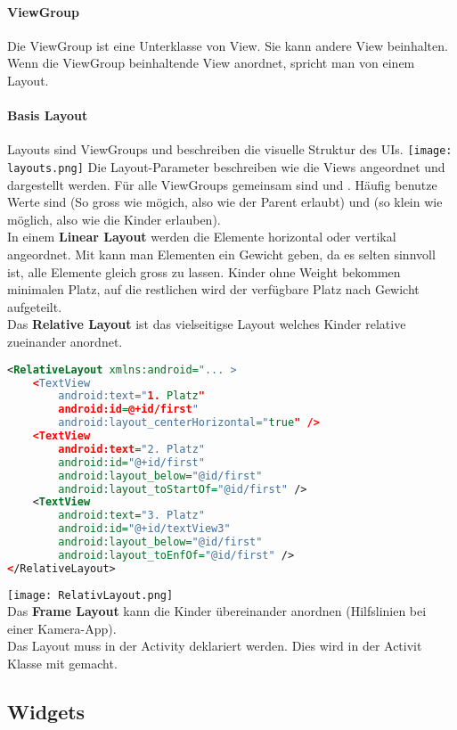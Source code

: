 \paragraph{ViewGroup} Die ViewGroup ist eine Unterklasse von View. Sie kann andere View beinhalten. Wenn die ViewGroup beinhaltende View anordnet, spricht man von einem Layout.
\paragraph{Basis Layout} Layouts sind ViewGroups und beschreiben die visuelle Struktur des UIs.
\texttt{[image: layouts.png]}
Die Layout-Parameter beschreiben wie die Views angeordnet und dargestellt werden. Für alle ViewGroups gemeinsam sind  und . Häufig benutze Werte sind  (So gross wie mögich, also wie der Parent erlaubt) und  (so klein wie möglich, also wie die Kinder erlauben).\\
In einem \textbf{Linear Layout} werden die Elemente horizontal oder vertikal angeordnet. Mit  kann man Elementen ein Gewicht geben, da es selten sinnvoll ist, alle Elemente gleich gross zu lassen. Kinder ohne Weight bekommen minimalen Platz, auf die restlichen wird der verfügbare Platz nach Gewicht aufgeteilt.\\
Das \textbf{Relative Layout} ist das vielseitigse Layout welches Kinder relative zueinander anordnet.
\begin{lstlisting}[language=xml]
<RelativeLayout xmlns:android="... >
    <TextView
        android:text="1. Platz"
        android:id=@+id/first"
        android:layout_centerHorizontal="true" />
    <TextView
        android:text="2. Platz"
        android:id="@+id/first"
        android:layout_below="@id/first"
        android:layout_toStartOf="@id/first" />
    <TextView
        android:text="3. Platz"
        android:id="@+id/textView3"
        android:layout_below="@id/first"
        android:layout_toEnfOf="@id/first" />
</RelativeLayout>
\end{lstlisting}
\texttt{[image: RelativLayout.png]} \\
Das \textbf{Frame Layout} kann die Kinder übereinander anordnen (Hilfslinien bei einer Kamera-App).\\
Das Layout muss in der Activity deklariert werden. Dies wird in der Activit Klasse mit  gemacht.\\
\subsection{Widgets}
